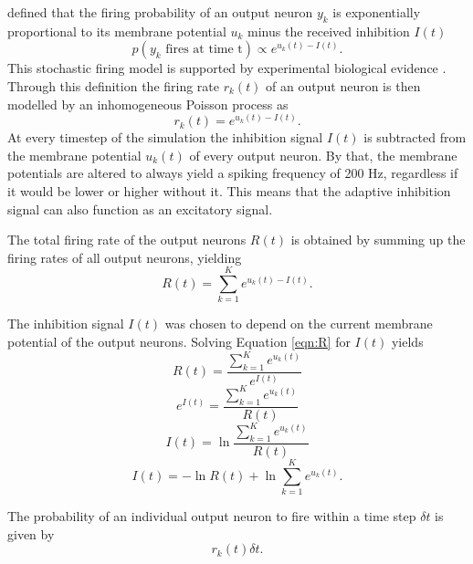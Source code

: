 \citet{nessler} defined that the firing probability of an output neuron  $y_k$ is exponentially proportional to its membrane potential $u_k$ minus the received inhibition $I(t)$
\begin{equation}
\label{eqn:pVonY}
p(y_k \text{ fires at time t}) \propto e^{u_k(t) - I(t)}.
\end{equation}
This stochastic firing model is supported by experimental biological evidence \citep{woDasEHerkommt}. Through this definition the firing rate $r_k(t)$ of an output neuron is then modelled by an inhomogeneous Poisson process as
\begin{equation}
\label{eqn:rk}
r_k(t) = e^{u_k(t) - I(t)}.
\end{equation}
At every timestep of the simulation the inhibition signal $I(t)$ is subtracted from the membrane potential $u_k(t)$ of every output neuron. By that, the membrane potentials are altered to always yield a spiking frequency of 200 Hz, regardless if it would be lower or higher without it. This means that the adaptive inhibition signal can also function as an excitatory signal. 

The total firing rate of the output neurons $R(t)$	 is obtained by summing up the firing rates of all output neurons, yielding 
\begin{equation}
\label{eqn:R}
R(t) = \sum_{k=1}^K e^{u_k(t) - I(t)}.
\end{equation}

The inhibition signal $I(t)$ was chosen to depend on the current membrane potential of the output neurons. 
Solving Equation \ref{eqn:R} for $I(t)$ yields
\begin{equation}
\label{}
R(t) = \frac{ \sum_{k=1}^K e^{u_k(t)}}{e^{I(t)}}
\end{equation}
\begin{equation}
\label{}
e^{I(t)} = \frac{\sum_{k=1}^K e^{u_k(t)}}{R(t)}
\end{equation}
\begin{equation}
\label{}
I(t) = \ln{ \frac{ \sum_{k=1}^K e^{u_k(t)}}{R(t)}}
\end{equation}
\begin{equation}
\label{eqn:I(t)}
I(t) =  - \ln{R(t)} + \ln{  \sum_{k=1}^K e^{u_k(t)}}.
\end{equation}

The probability of an individual output neuron to fire within a time step $\delta t$ is given by
\begin{equation}
\label{eqn:rkdt}
r_k(t) \delta t.
\end{equation}

